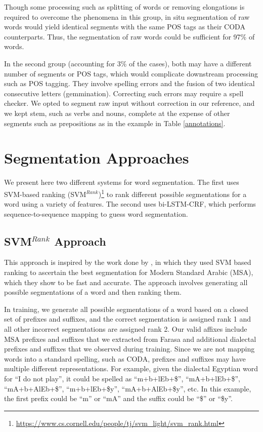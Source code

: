\documentclass[11pt,letterpaper]{article}
\begin{document}
Though some processing such as splitting of words or removing elongations is required to overcome the phenomena in this group, in situ segmentation of raw words would yield identical segments with the same POS tags as their CODA counterparts.  Thus, the segmentation of raw words could be sufficient for 97\% of words. 


In the second group (accounting for 3\% of the cases), both may have a different number of segments or POS tags, which would complicate downstream processing such as POS tagging.  They involve spelling errors and the fusion of two identical consecutive letters (gemmination). Correcting such errors may require a spell checker.  We opted to segment raw input without correction in our reference, and we kept stem, such as verbs and nouns, complete at the expense of other segments such as prepositions as in the example in Table \ref{annotations}.













\section{Segmentation Approaches}
\label{segmentationapproaches}
We present here two different systems for word segmentation. The first uses SVM-based ranking (SVM$^{Rank}$)\footnote{\url{https://www.cs.cornell.edu/people/tj/svm_light/svm_rank.html}} to rank different possible segmentations for a word using a variety of features. The second uses bi-LSTM-CRF, which performs sequence-to-sequence mapping to guess word segmentation.



\subsection{SVM$^{Rank}$ Approach}
This approach is inspired by the work done by , in which they used SVM based ranking to ascertain the best segmentation for Modern Standard Arabic (MSA), which they show to be fast and accurate. The approach involves generating all possible segmentations of a word and then ranking them. 

In training, we generate all possible segmentations of a word based on a closed set of prefixes and suffixes, and the correct segmentation is assigned rank 1 and all other incorrect segmentations are assigned rank 2. Our valid affixes include MSA prefixes and suffixes that we extracted from Farasa \cite{abdelali2016farasa} and additional dialectal prefixes and suffixes that we observed during training.  Since we are not mapping words into a standard spelling, such as CODA, prefixes and suffixes may have multiple different representations.  For example, given the dialectal Egyptian word for ``I do not play'', it could be spelled as ``m+b+lEb+\$'', ``mA+b+lEb+\$'', ``mA+b+AlEb+\$'', ``m+b+lEb+\$y'', ``mA+b+AlEb+\$y'', etc.  In this example, the first prefix could be ``m'' or ``mA'' and the suffix could be ``\$'' or ``\$y''.  
\end{document}
